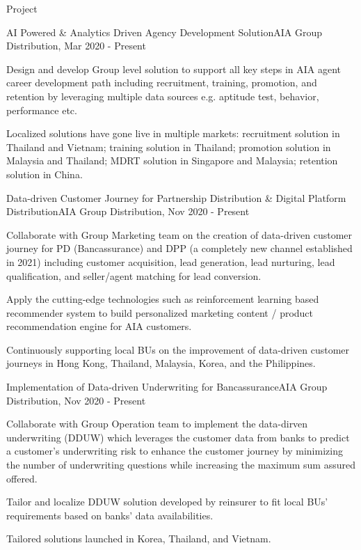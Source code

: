 \documentclass{resume} %
\begin{document}
\begin{rSection}{Project}


\begin{rSubsection}{AI Powered \& Analytics Driven Agency Development Solution}{}{AIA Group Distribution, Mar 2020 - Present}{}
\item Design and develop Group level solution to support all key steps in AIA agent career development path including recruitment, training, promotion, and retention by leveraging multiple data sources e.g. aptitude test, behavior, performance etc.
\item Localized solutions have gone live in multiple markets: recruitment solution in Thailand and Vietnam; training solution in Thailand; promotion solution in Malaysia and Thailand; MDRT solution in Singapore and Malaysia; retention solution in China.
\end{rSubsection}


\begin{rSubsection}{Data-driven Customer Journey for Partnership Distribution \& Digital Platform Distribution}{}{AIA Group Distribution, Nov 2020 - Present}{}
\item Collaborate with Group Marketing team on the creation of data-driven customer journey for PD (Bancassurance) and DPP (a completely new channel established in 2021) including customer acquisition, lead generation, lead nurturing, lead qualification, and seller/agent matching for lead conversion.   
\item Apply the cutting-edge technologies such as reinforcement learning based recommender system to build personalized marketing content / product recommendation engine for AIA customers.
\item Continuously supporting local BUs on the improvement of data-driven customer journeys in Hong Kong, Thailand, Malaysia, Korea, and the Philippines. 
\end{rSubsection}


\begin{rSubsection}{Implementation of Data-driven Underwriting for Bancassurance}{}{AIA Group Distribution, Nov 2020 - Present}{}
\item Collaborate with Group Operation team to implement the data-dirven underwriting (DDUW) which leverages the customer data from banks to predict a customer's underwriting risk to enhance the customer journey by minimizing the number of underwriting questions while increasing the maximum sum assured offered.
\item Tailor and localize DDUW solution developed by reinsurer to fit local BUs' requirements based on banks' data availabilities.
\item Tailored solutions launched in Korea, Thailand, and Vietnam.
\end{rSubsection}


\end{rSection}
\end{document}
